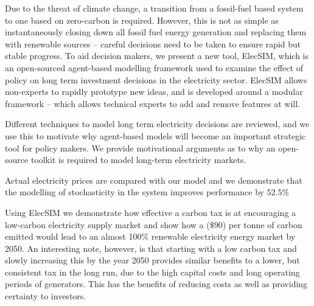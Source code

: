 Due to the threat of climate change, a transition from a fossil-fuel based system to one based on zero-carbon is required. However, this is not as simple as instantaneously closing down all fossil fuel energy generation and replacing them with renewable sources -- careful decisions need to be taken to ensure rapid but stable progress. To aid decision makers, we present a new tool, ElecSIM, which is an open-sourced agent-based modelling framework used to examine the effect of policy on long term investment decisions in the electricity sector. ElecSIM allows non-experts to rapidly prototype new ideas, and is developed around a modular framework -- which allows technical experts to add and remove features at will. 

Different techniques to model long term electricity decisions are reviewed, and we use this to motivate why agent-based models will become an important strategic tool for policy makers. We provide motivational arguments as to why an open-source toolkit is required to model long-term electricity markets.

Actual electricity prices are compared with our model and we demonstrate that the modelling of stochasticity in the system improves performance by $52.5\%$

Using ElecSIM we demonstrate how effective a carbon tax is at encouraging a low-carbon electricity supply market and show how a  ($\$90$) per tonne of carbon emitted would lead to an almost 100\% renewable electricity energy market by 2050. An interesting note, however, is that starting with a low carbon tax and slowly increasing this by the year 2050 provides similar benefits to a lower, but consistent tax in the long run, due to the high capital costs and long operating periods of generators. This has the benefits of reducing costs as well as providing certainty to investors.
